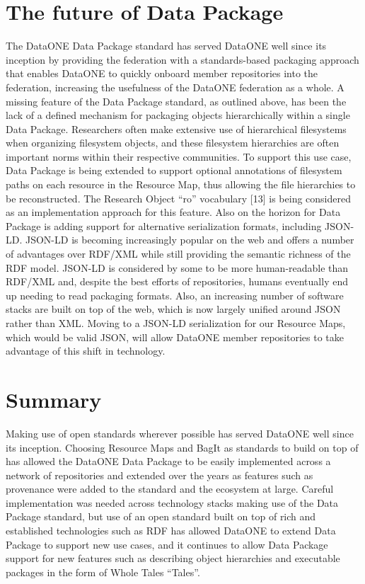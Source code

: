 \documentclass[conference]{IEEEtran}
\begin{document}
\section{The future of Data Package}

The DataONE Data Package standard has served DataONE well since its inception by providing the federation with a standards-based packaging approach that enables DataONE to quickly onboard member repositories into the federation, increasing the usefulness of the DataONE federation as a whole.
A missing feature of the Data Package standard, as outlined above, has been the lack of a defined mechanism for packaging objects hierarchically within a single Data Package.
Researchers often make extensive use of hierarchical filesystems when organizing filesystem objects, and these filesystem hierarchies are often important norms within their respective communities.
To support this use case, Data Package is being extended to support optional annotations of filesystem paths on each resource in the Resource Map, thus allowing the file hierarchies to be reconstructed.
The Research Object “ro” vocabulary [13] is being considered as an implementation approach for this feature.
Also on the horizon for Data Package is adding support for alternative serialization formats, including JSON-LD.
JSON-LD is becoming increasingly popular on the web and offers a number of advantages over RDF/XML while still providing the semantic richness of the RDF model.
JSON-LD is considered by some to be more human-readable than RDF/XML and, despite the best efforts of repositories, humans eventually end up needing to read packaging formats.
Also, an increasing number of software stacks are built on top of the web, which is now largely unified around JSON rather than XML.
Moving to a JSON-LD serialization for our Resource Maps, which would be valid JSON, will allow DataONE member repositories to take advantage of this shift in technology.

\section{Summary}

Making use of open standards wherever possible has served DataONE well since its inception.
Choosing Resource Maps and BagIt as standards to build on top of has allowed the DataONE Data Package to be easily implemented across a network of repositories and extended over the years as features such as provenance were added to the standard and the ecosystem at large.
Careful implementation was needed across technology stacks making use of the Data Package standard, but use of an open standard built on top of rich and established technologies such as RDF has allowed DataONE to extend Data Package to support new use cases, and it continues to allow Data Package support for new features such as describing object hierarchies and executable packages in the form of Whole Tales “Tales”.
\end{document}
